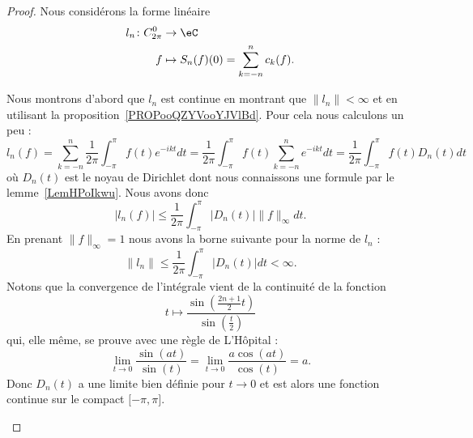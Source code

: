 \begin{proof}
	Nous considérons la forme linéaire
	\begin{equation}
		\begin{aligned}
			l_n\colon C^0_{2\pi} & \to \eC                                \\
			f                    & \mapsto S_n(f)(0)=\sum_{k=-n}^nc_k(f).
		\end{aligned}
	\end{equation}
	\begin{subproof}
		Nous montrons d'abord que \(  l_n \) est continue en montrant que \( \| l_n \|<\infty\) et en utilisant la proposition~\ref{PROPooQZYVooYJVlBd}. Pour cela nous calculons un peu :
		\begin{equation}    \label{EqBELHGya}
			l_n(f)=\sum_{k=-n}^n\frac{1}{ 2\pi }\int_{-\pi}^{\pi}f(t) e^{-ikt}dt=\frac{1}{ 2\pi }\int_{-\pi}^{\pi}f(t)\sum_{k=-n}^n e^{-ikt}dt=\frac{1}{ 2\pi }\int_{-\pi}^{\pi}f(t)D_n(t)dt
		\end{equation}
		où \( D_n(t)\) est le noyau de Dirichlet dont nous connaissons une formule par le lemme~\ref{LemHPoIkwu}. Nous avons donc
		\begin{equation}
			| l_n(f) |\leq \frac{1}{ 2\pi }\int_{-\pi}^{\pi}| D_n(t) |\| f \|_{\infty}dt.
		\end{equation}
		En prenant \( \| f \|_{\infty}=1\) nous avons la borne suivante pour la norme de \( l_n\) :
		\begin{equation}        \label{EqBXoIUiD}
			\| l_n \|\leq \frac{1}{ 2\pi }\int_{-\pi}^{\pi}| D_n(t) |dt<\infty.
		\end{equation}
		Notons que la convergence de l'intégrale vient de la continuité de la fonction
		\begin{equation}
			t\mapsto \frac{ \sin\left( \frac{ 2n+1 }{2}t \right) }{ \sin\left( \frac{ t }{ 2 } \right) }
		\end{equation}
		qui, elle même, se prouve avec une règle de L'Hôpital :
		\begin{equation}
			\lim_{t\to 0} \frac{ \sin(at) }{ \sin(t) }=\lim_{t\to 0} \frac{ a\cos(at) }{ \cos(t) }=a.
		\end{equation}
		Donc \( D_n(t)\) a une limite bien définie pour \( t\to 0\) et est alors une fonction continue sur le compact \( \mathopen[ -\pi , \pi \mathclose]\).



\end{subproof}
\end{proof}
